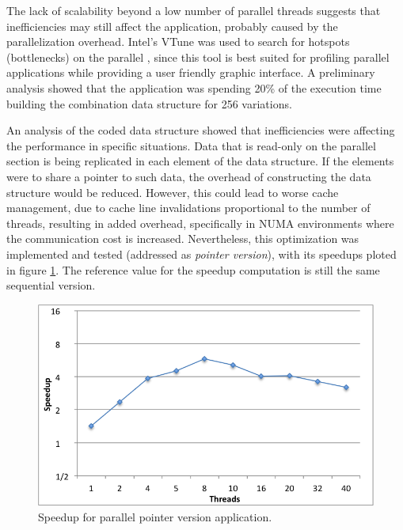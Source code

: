 
The lack of scalability beyond a low number of parallel threads suggests that inefficiencies may still affect the application, probably caused by the parallelization overhead. Intel's VTune was used to search for hotspots (bottlenecks) on the parallel \tth, since this tool is best suited for profiling parallel applications while providing a user friendly graphic interface. A preliminary analysis showed that the application was spending 20\% of the execution time building the combination data structure for 256 variations.

An analysis of the coded data structure showed that inefficiencies were affecting the performance in specific situations. Data that is read-only on the parallel section is being replicated in each element of the data structure. If the elements were to share a pointer to such data, the overhead of constructing the data structure would be reduced. However, this could lead to worse cache management, due to cache line invalidations proportional to the number of threads, resulting in added overhead, specifically in NUMA environments where the communication cost is increased. Nevertheless, this optimization was implemented and tested (addressed as \textit{pointer version}), with its speedups ploted in figure \ref{fig:pointer_speedup}. The reference value for the speedup computation is still the same sequential version.

\begin{figure}[!htp]
	\begin{center}
		\includegraphics[scale=0.55]{charts/speedup_pointer_omp.png}
		\caption{Speedup for \tth parallel pointer version application.}
		\label{fig:pointer_speedup}
	\end{center}
\end{figure}

